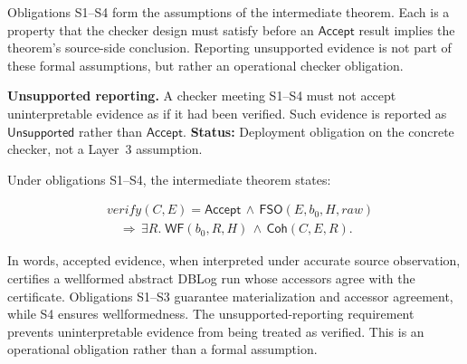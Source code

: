 \documentclass[letterpaper,10pt,twocolumn]{article}
\newcommand{\Verify}{\mathit{verify}}
\newcommand{\RawObs}{\mathit{raw}}
\newcommand{\WF}{\mathsf{WF}}
\newcommand{\FSO}{\mathsf{FSO}}
\newcommand{\Coh}{\mathsf{Coh}}
\newcommand{\Accept}{\mathsf{Accept}}
\newcommand{\Unsupported}{\mathsf{Unsupported}}
\begin{document}
\begin{table}[t]
\caption{Checker obligations S1--S4 for the
accepted-certificate intermediate theorem.}
\label{tab:checker-substrate}
\centering\small
{}
\end{table}

Obligations S1--S4 form the assumptions of the intermediate
theorem. Each is a property that the checker design must satisfy before
an $\Accept$ result implies the theorem's source-side conclusion.
Reporting unsupported evidence is not part of these formal assumptions,
but rather an operational checker obligation.

\smallskip
\noindent\textbf{Unsupported reporting.} A checker meeting S1--S4 must
not accept uninterpretable evidence as if it had been verified.
Such evidence is reported as $\Unsupported$ rather than
$\Accept$. \textbf{Status:} Deployment obligation on the concrete
checker, not a Layer~3 assumption.

Under obligations S1--S4, the intermediate theorem states:

\[
\begin{aligned}
&\Verify(C,E)=\Accept \,\land\, \FSO(E,b_0,H,\RawObs)\\
&\quad\Longrightarrow\, \exists R.\;
   \WF(b_0,R,H) \,\land\, \Coh(C,E,R).
\end{aligned}
\]

In words, accepted evidence, when interpreted under accurate source
observation, certifies a wellformed abstract DBLog run whose accessors
agree with the certificate. Obligations S1--S3 guarantee materialization
and accessor agreement, while S4 ensures wellformedness. The
unsupported-reporting requirement prevents uninterpretable evidence
from being treated as verified. This is an operational obligation rather
than a formal assumption.
\end{document}
